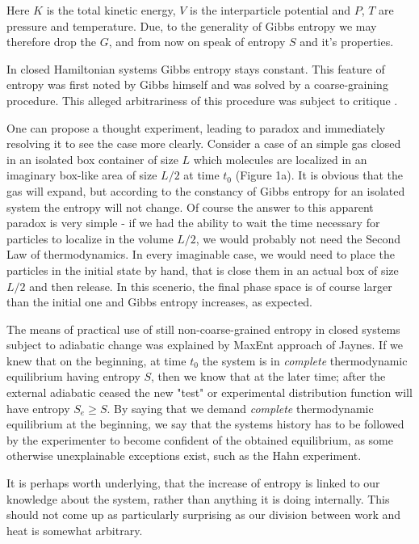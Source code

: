 \documentclass[a4paper,12pt]{article}
\begin{document}
Here $K$ is the total kinetic energy, $V$ is the interparticle potential and $P$, $T$ are pressure and temperature. 
Due, to the generality of Gibbs entropy we may therefore drop the $G$, and from now on speak of entropy $S$ and it's properties.

In closed Hamiltonian systems Gibbs entropy stays constant.
This feature of entropy was first noted by Gibbs himself and was solved by a coarse-graining procedure\cite{Gibbs:1928tw}. This alleged arbitrariness of this procedure was subject to critique \cite{Evans:2241458}. %

One can propose a thought experiment, leading to paradox and immediately resolving it to see the case more clearly. Consider a case of an simple gas closed in an isolated box container of size $L$ which molecules are localized in an imaginary box-like area of size $L/2$ at time $t_0$ (Figure 1a). %
It is obvious that the gas will expand, but according to the constancy of Gibbs entropy for an isolated system the entropy will not change. Of course the answer to this apparent paradox is very simple - if we had the ability to wait the time necessary for particles to localize in the volume $L/2$, we would probably not need the Second Law of thermodynamics. In every imaginable case, we  would need to place the particles in the initial state by hand, that is close them in an actual box of size $L/2$ and then release. 
In this scenerio, the final phase space is of course larger than the initial one and Gibbs entropy increases, as expected.

The means of practical use of still non-coarse-grained entropy in closed systems subject to adiabatic change was explained by MaxEnt approach of Jaynes\cite{Jaynes:1965gg}. If we knew that on the beginning, at time $t_0$ the system is in \textit{complete} thermodynamic equilibrium having entropy $S$, then we know that at the later time; after the external adiabatic ceased the new "test" or experimental distribution function will have entropy $S_e \geq S$. By saying that we demand \textit{complete} thermodynamic equilibrium at the beginning, we say that the systems history has to be followed by the experimenter to become confident of the obtained equilibrium, as some otherwise unexplainable exceptions exist, such as the Hahn experiment. %

It is perhaps worth underlying, that the increase of entropy is linked to our knowledge about the system, rather than anything it is doing internally. This should not come up as particularly surprising as our division between work and heat is somewhat arbitrary.
\end{document}
